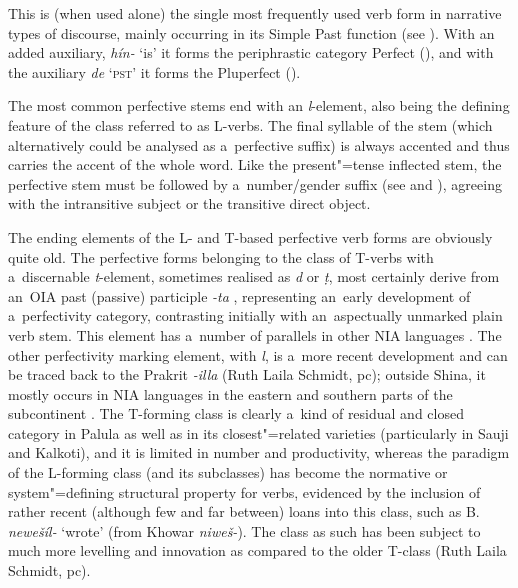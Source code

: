  This is (when used alone) the single most frequently used verb form in
narrative types of discourse, mainly occurring in its Simple Past function (see ). With an added auxiliary, \textit{hín-} `is' it forms the periphrastic category Perfect (), and with the auxiliary \textit{de} `\textsc{pst}' it forms the Pluperfect ().


The most common perfective stems end with an \textit{l}-element,
also being the defining feature of the class referred to as L-verbs. The final syllable of the stem
(which alternatively could be analysed as a~perfective suffix) is always accented and thus carries
the accent of the whole word. Like the present"=tense inflected stem, the perfective stem must be
followed by a~number/gender suffix (see  and ), agreeing with
the intransitive subject or the transitive direct object.



The ending elements of the L- and T-based perfective verb forms are obviously quite old. The perfective forms belonging to the class of T-verbs with a~discernable \textit{t}-element, sometimes realised as \textit{d} or \textit{ṭ}, most certainly derive from an~OIA past (passive) participle \textit{-ta} \citep[952]{whitney1960}, representing an~early development of a~perfectivity category, contrasting initially with an~aspectually unmarked plain verb stem. This element has a~number of parallels in other NIA languages \citep[269, 272]{masica1991}. The other perfectivity marking element, with \textit{l}, is a~more recent development and can be traced back to the Prakrit \textit{-illa} (Ruth Laila Schmidt, pc); outside Shina, it mostly occurs in NIA languages in the eastern and southern parts of the subcontinent \citep[270]{masica1991}. The T-forming class is clearly a~kind of residual and closed category in Palula as well as in its closest"=related varieties (particularly in Sauji and Kalkoti), and it is limited in number and productivity, whereas the paradigm of the L-forming class (and its subclasses) has become the normative or system"=defining structural property \citep[104]{mcmahon1994} for verbs, evidenced by the inclusion of rather recent (although few and far between) loans into this class, such as B. \textit{newešíl-} `wrote' (from Khowar \textit{niweš-}). The class as such has been subject to much more levelling and innovation as compared to the older T-class (Ruth Laila Schmidt, pc).



